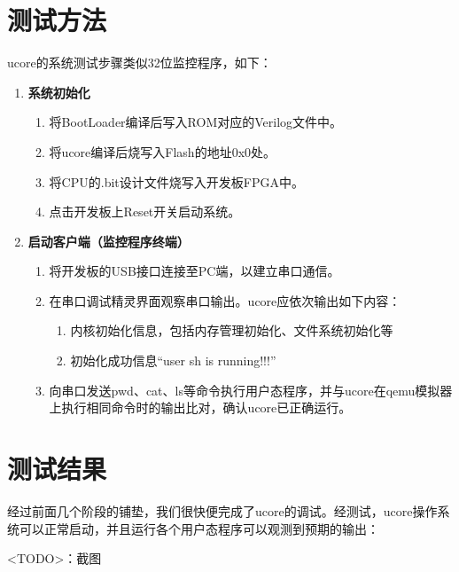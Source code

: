 \section{测试方法}

ucore的系统测试步骤类似32位监控程序，如下：

\begin{enumerate}
    \item {\bf 系统初始化}

    \begin{enumerate}
        \item 将BootLoader编译后写入ROM对应的Verilog文件中。
        \item 将ucore编译后烧写入Flash的地址0x0处。
        \item 将CPU的.bit设计文件烧写入开发板FPGA中。
        \item 点击开发板上Reset开关启动系统。
    \end{enumerate}

    \item {\bf 启动客户端（监控程序终端）}

    \begin{enumerate}
        \item 将开发板的USB接口连接至PC端，以建立串口通信。
        \item 在串口调试精灵界面观察串口输出。ucore应依次输出如下内容：

        \begin{enumerate}
            \item 内核初始化信息，包括内存管理初始化、文件系统初始化等
            \item 初始化成功信息``user sh is running!!!''
        \end{enumerate}

        \item 向串口发送pwd、cat、ls等命令执行用户态程序，并与ucore在qemu模拟器上执行相同命令时的输出比对，确认ucore已正确运行。
    \end{enumerate}

\end{enumerate}

\section{测试结果}

经过前面几个阶段的铺垫，我们很快便完成了ucore的调试。经测试，ucore操作系统可以正常启动，并且运行各个用户态程序可以观测到预期的输出：

<TODO>：截图

